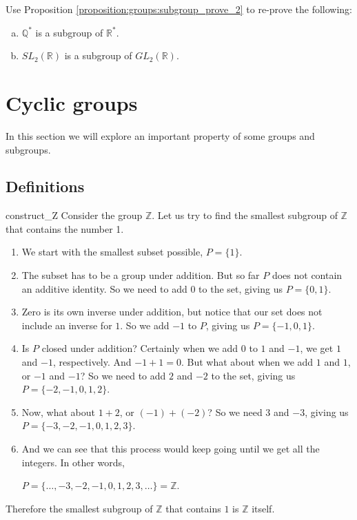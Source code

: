 \begin{exercise}{73}
Use Proposition \ref{proposition:groups:subgroup_prove_2} to re-prove the following:
\begin{enumerate}[(a)]
\item
${\mathbb Q}^*$ is a subgroup of ${\mathbb R}^*$.
\item
$SL_2( {\mathbb R})$ is a subgroup of $GL_2( {\mathbb R})$.
\end{enumerate}
\end{exercise}


\section{Cyclic groups\quad
{}}\label{cyclic_groups}
 
In this section we will explore an important property of some groups and subgroups.  

\subsection{Definitions}\label{subsec:groups:cyclic_groups}

\begin{example}{construct_Z}
Consider the group ${\mathbb Z}$.  Let us try to find the smallest subgroup of ${\mathbb Z}$ that contains the number 1.
\begin{enumerate}[(1)]
\item
We start with the smallest subset possible, $P = \{ 1 \}$.
\item
The subset has to be a group under addition.  But so far $P$ does not contain an additive identity.  So we need to add $0$ to the set, giving us $P = \{ 0, 1 \}$. 
\item
Zero is its own inverse under addition, but notice that our set does not include an inverse for $1$.  So we add $-1$ to $P$, giving us  $P = \{ -1, 0, 1 \}$.
\item
Is $P$ closed under addition?  Certainly when we add $0$ to $1$ and $-1$, we get $1$ and $-1$, respectively.  And $-1 + 1 = 0$.  But what about when we add $1$ and $1$, or $-1$ and $-1$?  So we need to add $2$ and $-2$ to the set, giving us $P = \{ -2, -1, 0, 1, 2 \}$.
\item
Now, what about $1 + 2$, or $(-1) + (-2)$?  So we need $3$ and $-3$, giving us $P = \{ -3, -2, -1, 0, 1, 2, 3 \}$.
\item
And we can see that this process would keep going until we get all the integers.  In other words, 

\noindent
 $P = \{ \ldots, -3, -2, -1, 0, 1, 2, 3, \ldots \} = {\mathbb Z}$.
\end{enumerate}

\noindent
Therefore the smallest subgroup of $\mathbb Z$ that contains $1$ is $\mathbb Z$ itself.
\end{example}


